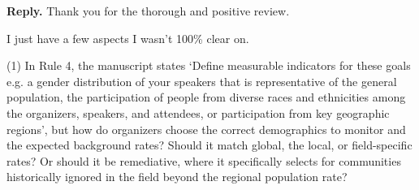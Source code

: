 \documentclass{article}
\newenvironment{Reply}{\noindent\color{BlueViolet}\textbf{Reply.}}{\vspace{1em}}
\begin{document}
\begin{Reply}
    Thank you for the thorough and positive review.
\end{Reply}

I just have a few aspects I wasn't 100\% clear on.


(1) In Rule 4, the manuscript states `Define measurable indicators for these goals e.g. a gender distribution of your speakers that is representative of the general population, the participation of people from diverse races and ethnicities among the organizers, speakers, and attendees, or participation from key geographic regions', but how do organizers choose the correct demographics to monitor and the expected background rates? Should it match global, the local, or field-specific rates? Or should it be remediative, where it specifically selects for communities historically ignored in the field beyond the regional population rate?
\end{document}
